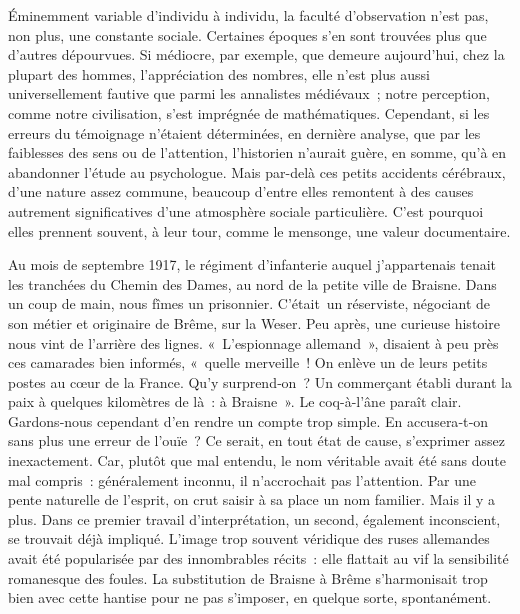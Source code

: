 \documentclass[french,twoside]{book} %
\newcommand{\astermono}{\medskip\centerline{\color{rubric}\large\selectfont{\syms ✻}}\medskip\par}%
\begin{document}
\astermono

\noindent Éminemment variable d’individu à individu, la faculté d’observation n’est pas, non plus, une constante sociale. Certaines époques s’en sont trouvées plus que d’autres dépourvues. Si médiocre, par exemple, que demeure aujourd’hui, chez la plupart des hommes, l’appréciation des nombres, elle n’est plus aussi universellement fautive que parmi les anna­listes médiévaux ; notre perception, comme notre civilisation, s’est imprégnée de mathématiques. Cependant, si les erreurs du témoignage n’étaient déterminées, en dernière analyse, que par les faiblesses des sens ou de l’attention, l’historien n’aurait guère, en somme, qu’à en abandonner l’étude au psychologue. Mais par-delà ces petits accidents cérébraux, d’une nature assez commune, beaucoup d’entre elles remontent à des causes autrement significatives d’une atmosphère sociale particulière. C’est pourquoi elles prennent souvent, à leur tour, comme le mensonge, une valeur documentaire.\par
Au mois de septembre 1917, le régiment d’infanterie auquel j’appar­tenais tenait les tranchées du Chemin des Dames, au nord de la petite ville de Braisne. Dans un coup de main, nous fîmes un prisonnier. C’était un réserviste, négociant de son métier et originaire de Brême, sur la Weser. Peu après, une curieuse histoire nous vint de l’arrière des lignes. « L’espionnage allemand », disaient à peu près ces camarades bien informés, « quelle merveille ! On enlève un de leurs petits postes au cœur de la France. Qu’y surprend‑on ? Un commerçant établi durant la paix à quelques kilomètres de là : à Braisne ». Le coq-à-l’âne paraît clair. Gardons‑nous cependant d’en rendre un compte trop simple. En accusera‑t‑on sans plus une erreur de l’ouïe ? Ce serait, en tout état de cause, s’exprimer assez inexactement. Car, plutôt que mal entendu, le nom véritable avait été sans doute mal compris : généralement inconnu, il n’accrochait pas l’attention. Par une pente naturelle de l’esprit, on crut saisir à sa place un nom familier. Mais il y a plus. Dans ce premier travail d’interprétation, un second, également inconscient, se trouvait déjà impliqué. L’image trop souvent véridique des ruses allemandes avait été popularisée par des  
\label{p50} innombrables récits : elle flattait au vif la sensibilité romanesque des foules. La substitution de Braisne à Brême s’harmonisait trop bien avec cette hantise pour ne pas s’imposer, en quelque sorte, spontanément.\par
\end{document}
